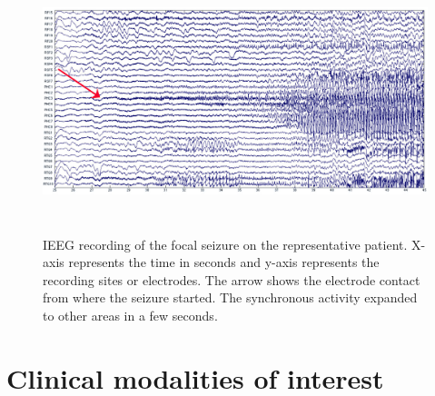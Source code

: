 \begin{figure}
\centerline{
	\includegraphics[height =3in]{Plots/Seizure-onset-sample.jpg}
	}
	\caption{IEEG recording of the focal seizure on the representative patient. X-axis represents the time in seconds and y-axis represents the recording sites or electrodes. The arrow shows the electrode contact from where the seizure started. The synchronous activity expanded to other areas in a few seconds.
	\label{fig:seizure-onset-sample}
}
\end{figure}

\section{Clinical modalities of interest}

